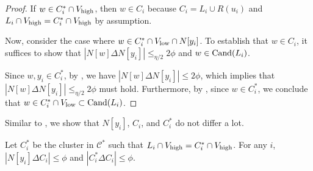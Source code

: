 \begin{proof}
If $w \in C^{*}_i \cap V_{\operatorname{high}}$, then $w \in C_i$ because $C_i = L_i \cup R(u_i)$ and ${L}_i \cap V_{\operatorname{high}} = C^{*}_i \cap V_{\operatorname{high}}$ by assumption. 

Now, consider the case where $w \in C^{*}_i \cap V_{\operatorname{low}} \cap N[y_i]$. To establish that $w \in C_i$, it suffices to show that $|N[w] \Delta N[y_i]| \leq_{\eta/2} 2\phi$ and $w \in \mathrm{Cand}(L_i)$. 

Since $w, y_i \in C^{*}_i$, by , we have $|N[w] \Delta N[y_i]| \leq 2\phi$, which implies that $|N[w] \Delta N[y_i]| \leq_{\eta/2} 2\phi$ must hold. Furthermore, by , since $w \in C^*_i$, we conclude that $w \in C^*_i \cap V_{\operatorname{low}} \subset \mathrm{Cand}(L_i)$. 
\end{proof}


Similar to , we show that $N[y_i]$, $C_i$, and $C^*_i$ do not differ a lot.


\begin{lemma}
\label{lem:closeness2} 
Let $C^{*}_i$ be the cluster in $\mathcal{C}^{*}$ such that ${L}_i \cap V_{\operatorname{high}} = {C}^{*}_{i} \cap V_{\operatorname{high}}$. For any $i$, $|N[y_i] \Delta C_i| \leq \phi$ and $|C^{*}_i \Delta C_{i}| \leq \phi$. 
\end{lemma}


